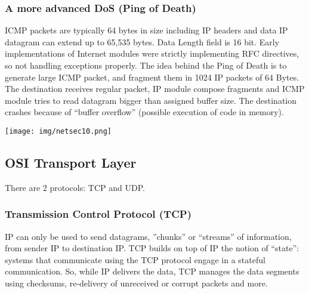 \documentclass[a4paper, 10pt, titlepage]{article}
\begin{document}
\subsubsection*{A more advanced DoS (Ping of Death)}
ICMP packets are typically 64 bytes in size including IP headers and data IP datagram can extend up to 65,535 bytes. Data Length field is 16 bit. Early implementations of Internet modules were strictly implementing RFC
directives, so not handling exceptions properly. The idea behind the Ping of Death is to generate large ICMP packet, and fragment them in 1024 IP packets of 64 Bytes. The destination receives regular packet, IP module compose fragments and ICMP module tries to read datagram bigger than assigned buffer size. The destination crashes because of “buffer overflow” (possible execution of code in memory).
\begin{center}
	\texttt{[image: img/netsec10.png]}
\end{center}

\subsection{OSI Transport Layer}
There are 2 protocols: TCP and UDP.
\subsubsection{Transmission Control Protocol (TCP)}
IP can only be used to send datagrams, ”chunks” or “streams” of information, from sender IP to destination IP. TCP builds on top of IP the notion of “state”: systems that communicate using the TCP protocol engage in a stateful communication.
So, while IP delivers the data, TCP manages the data segments using checksums, re-delivery of unreceived or corrupt packets and more.
\end{document}
